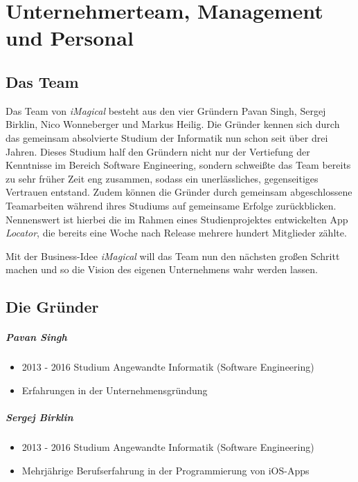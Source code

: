 \chapter{Unternehmerteam, Management und Personal}


\section{Das Team}

Das Team von \textit{iMagical} besteht aus den vier Gründern Pavan Singh, Sergej Birklin, Nico Wonneberger und Markus Heilig.
Die Gründer kennen sich durch das gemeinsam absolvierte Studium der Informatik nun schon seit über drei Jahren.
Dieses Studium half den Gründern nicht nur der Vertiefung der Kenntnisse im Bereich Software Engineering, sondern schweißte das Team bereits zu sehr früher Zeit eng zusammen, sodass ein unerlässliches, gegenseitiges Vertrauen entstand.
Zudem können die Gründer durch gemeinsam abgeschlossene Teamarbeiten während ihres Studiums auf gemeinsame Erfolge zurückblicken.
Nennenswert ist hierbei die im Rahmen eines Studienprojektes entwickelten App \textit{Locator}, die bereits eine Woche nach Release mehrere hundert Mitglieder zählte.

Mit der Business-Idee \textit{iMagical} will das Team nun den nächsten großen Schritt machen und so die Vision des eigenen Unternehmens wahr werden lassen.

\section{Die Gründer}

\paragraph{Pavan Singh}
\begin{itemize}
\item 2013 - 2016 Studium Angewandte Informatik (Software Engineering)
\item Erfahrungen in der Unternehmensgründung
\end{itemize}


\paragraph{Sergej Birklin}
\begin{itemize}
\item 2013 - 2016 Studium Angewandte Informatik (Software Engineering)
\item Mehrjährige Berufserfahrung in der Programmierung von iOS-Apps
\end{itemize}

